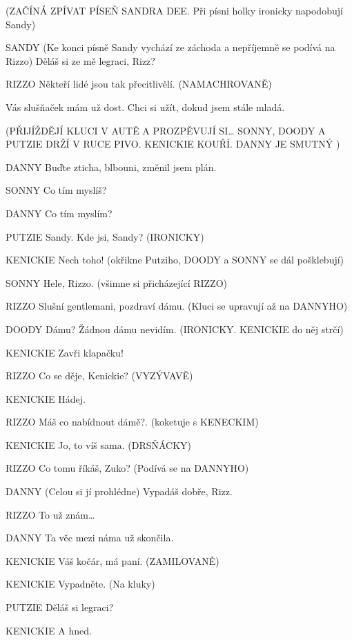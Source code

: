         (ZAČÍNÁ ZPÍVAT PÍSEŇ SANDRA DEE. Při písni holky ironicky                 napodobují Sandy)

SANDY        (Ke konci písně Sandy vychází ze záchoda a nepříjemně se podívá na         Rizzo)  Děláš si ze mě legraci, Rizz?

RIZZO        Někteří lidé jsou tak přecitlivělí. (NAMACHROVANĚ) 

        Vás slušňaček mám už dost. Chci si užít, dokud jsem stále mladá.





(PŘIJÍŽDĚJÍ KLUCI V AUTĚ A PROZPĚVUJÍ SI… SONNY, DOODY A PUTZIE         DRŽÍ V RUCE PIVO. KENICKIE KOUŘÍ. DANNY JE SMUTNÝ )

DANNY        Buďte zticha, blbouni, změnil jsem plán.

SONNY        Co tím myslíš?

DANNY        Co tím myslím? 

PUTZIE        Sandy. Kde jsi, Sandy? (IRONICKY)

KENICKIE        Nech toho! (okřikne Putziho, DOODY a SONNY se dál pošklebují)

SONNY        Hele, Rizzo. (všimne si přicházející RIZZO)

RIZZO        Slušní gentlemani,  pozdraví dámu. (Kluci se upravují až na DANNYHO)

DOODY        Dámu? Žádnou dámu nevidím. (IRONICKY. KENICKIE do něj strčí) 

KENICKIE        Zavři klapačku!

RIZZO        Co se děje, Kenickie? (VYZÝVAVĚ) 

KENICKIE        Hádej.

RIZZO        Máš co nabídnout dámě?. (koketuje s KENECKIM) 

KENICKIE        Jo, to víš sama. (DRSŇÁCKY) 

RIZZO        Co tomu říkáš, Zuko? (Podívá se na DANNYHO)

DANNY        (Celou si jí prohlédne) Vypadáš dobře, Rizz.

RIZZO         To už znám…

DANNY        Ta věc mezi náma už skončila.  

KENICKIE        Váš kočár, má paní. (ZAMILOVANĚ) 

KENICKIE        Vypadněte. (Na kluky)

PUTZIE        Děláš si legraci?

KENICKIE        A hned.

